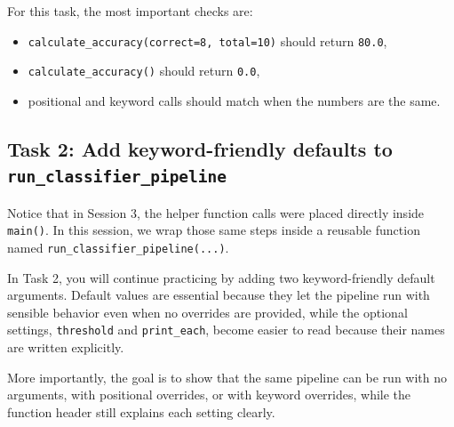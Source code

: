 


For this task, the most important checks are:
\begin{itemize}
    \item \texttt{calculate\_accuracy(correct=8, total=10)} should return \texttt{80.0},
    \item \texttt{calculate\_accuracy()} should return \texttt{0.0},
    \item positional and keyword calls should match when the numbers are the same.
\end{itemize}
\subsection{Task 2: Add keyword-friendly defaults to \texttt{run\_classifier\_pipeline}}
Notice that in Session 3, the helper function calls were placed directly inside \texttt{main()}. In this session, we wrap those same steps inside a reusable function named \texttt{run\_classifier\_pipeline(...)}.

In Task 2, you will continue practicing by adding two keyword-friendly default arguments. Default values are essential because they let the pipeline run with sensible behavior even when no overrides are provided, while the optional settings, \texttt{threshold} and \texttt{print\_each}, become easier to read because their names are written explicitly.

More importantly, the goal is to show that the same pipeline can be run with no arguments, with positional overrides, or with keyword overrides, while the function header still explains each setting clearly.

